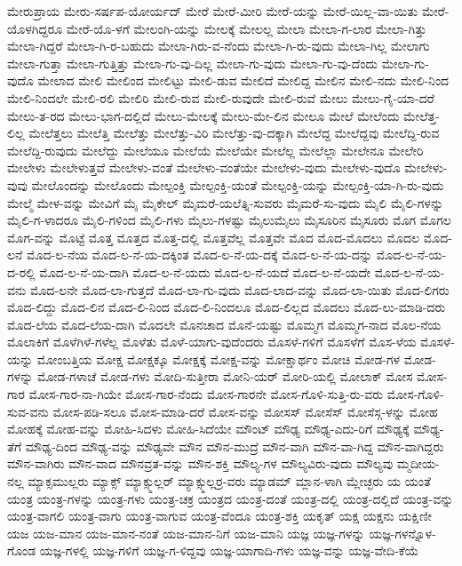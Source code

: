 {ಮೇರುಪ್ರಾಯ
ಮೇರು-ಸರ್ಷಪ-ಯೋರ್ಯದ್
ಮೇರೆ
ಮೇರೆ-ಮೀರಿ
ಮೇರೆ-ಯನ್ನು
ಮೇರೆ-ಯಿಲ್ಲ-ವಾ-ಯಿತು
ಮೇರೆ-ಯೊಳಗಿದ್ದರೂ
ಮೇರೆ-ಯೊ-ಳಗೆ
ಮೇಲಂಗಿ-ಯನ್ನು
ಮೇಲಕ್ಕೆ
ಮೇಲಲ್ಲ
ಮೇಲಾ
ಮೇಲಾ-ಗ-ಲಾರ
ಮೇಲಾ-ಗಿತ್ತು
ಮೇಲಾ-ಗಿದ್ದರೆ
ಮೇಲಾ-ಗಿ-ರ-ಬಹುದು
ಮೇಲಾ-ಗಿರು-ವ-ನೆಂದು
ಮೇಲಾ-ಗಿ-ರು-ವುದು
ಮೇಲಾ-ಗಿಲ್ಲ
ಮೇಲಾಗು
ಮೇಲಾ-ಗುತ್ತಾ
ಮೇಲಾ-ಗುತ್ತಿತ್ತು
ಮೇಲಾ-ಗು-ವು-ದಿಲ್ಲ
ಮೇಲಾ-ಗು-ವುದು
ಮೇಲಾ-ಗು-ವು-ದೆಂದು
ಮೇಲಾ-ಗು-ವುದೊ
ಮೇಲಾದ
ಮೇಲಿ
ಮೇಲಿಂದ
ಮೇಲಿಟ್ಟು
ಮೇಲಿ-ಡುವ
ಮೇಲಿದೆ
ಮೇಲಿದ್ದ
ಮೇಲಿನ
ಮೇಲಿ-ನದು
ಮೇಲಿ-ನಿಂದ
ಮೇಲಿ-ನಿಂದಲೇ
ಮೇಲಿ-ರಲಿ
ಮೇಲಿರಿ
ಮೇಲಿ-ರುವ
ಮೇಲಿ-ರುವುದೇ
ಮೇಲಿ-ರುವೆ
ಮೇಲು
ಮೇಲು-ಗೈ-ಯಾ-ದರೆ
ಮೇಲು-ತ-ರದ
ಮೇಲು-ಭಾಗ-ದಲ್ಲಿದೆ
ಮೇಲು-ಮೇಲಕ್ಕೆ
ಮೇಲು-ಮೇ-ಲಿನ
ಮೇಲೂ
ಮೇಲೆ
ಮೇಲೆಂದು
ಮೇಲೆತ್ತ-ಲಿಲ್ಲ
ಮೇಲೆತ್ತಲು
ಮೇಲೆತ್ತಿ
ಮೇಲೆತ್ತು
ಮೇಲೆತ್ತು-ವಿರಿ
ಮೇಲೆತ್ತು-ವು-ದಕ್ಕಾಗಿ
ಮೇಲೆದ್ದ
ಮೇಲೆದ್ದವು
ಮೇಲೆದ್ದಿ-ರುವ
ಮೇಲೆದ್ದಿ-ರುವುದು
ಮೇಲೆದ್ದು
ಮೇಲೆಯೂ
ಮೇಲೆಯೆ
ಮೇಲೆಯೇ
ಮೇಲೆಲ್ಲ
ಮೇಲೆಲ್ಲಾ
ಮೇಲೇನೂ
ಮೇಲೇರಿ
ಮೇಲೇಳು
ಮೇಲೇಳುತ್ತವೆ
ಮೇಲೇಳು-ವಂತೆ
ಮೇಲೇಳು-ವಂತೆಯೇ
ಮೇಲೇಳು-ವುದು
ಮೇಲೇಳು-ವುದೊ
ಮೇಲೇಳು-ವುವು
ಮೇಲೊಂದನ್ನು
ಮೇಲೊಂದು
ಮೇಲ್ಪಂಕ್ತಿ
ಮೇಲ್ಪಂಕ್ತಿ-ಯಂತೆ
ಮೇಲ್ಪಂಕ್ತಿ-ಯನ್ನು
ಮೇಲ್ಪಂಕ್ತಿ-ಯಾ-ಗಿ-ರು-ವುದು
ಮೇಲ್ಮೆ
ಮೇಳ-ವನ್ನು
ಮೇವಿಗೆ
ಮೈ
ಮೈಕೇಲ್
ಮೈಮರೆ-ಯಲೆತ್ನಿ-ಸುವರು
ಮೈಮರೆ-ಸು-ವುದು
ಮೈಲಿ
ಮೈಲಿ-ಗಳನ್ನು
ಮೈಲಿ-ಗ-ಳಾದರೂ
ಮೈಲಿ-ಗಳಿಂದ
ಮೈಲಿ-ಗಳು
ಮೈಲು-ಗಳಷ್ಟು
ಮೈಲುಮೈಲು
ಮೈಸೂರಿನ
ಮೈಸೂರು
ಮೊಗ
ಮೊಗಲ
ಮೊಗ-ವನ್ನು
ಮೊಟ್ಟೆ
ಮೊತ್ತ
ಮೊತ್ತದ
ಮೊತ್ತ-ದಲ್ಲಿ
ಮೊತ್ತವೆಲ್ಲ
ಮೊತ್ತವೇ
ಮೊದ
ಮೊದ-ಮೊದಲು
ಮೊದಲ
ಮೊದ-ಲನೆ
ಮೊದ-ಲ-ನೆಯ
ಮೊದ-ಲ-ನೆ-ಯ-ದಕ್ಕಿಂತ
ಮೊದ-ಲ-ನೆ-ಯ-ದಕ್ಕೆ
ಮೊದ-ಲ-ನೆ-ಯ-ದನ್ನು
ಮೊದ-ಲ-ನೆ-ಯ-ದ-ರಲ್ಲಿ
ಮೊದ-ಲ-ನೆ-ಯ-ದಾಗಿ
ಮೊದ-ಲ-ನೆ-ಯದು
ಮೊದ-ಲ-ನೆ-ಯದೆ
ಮೊದ-ಲ-ನೆ-ಯದೇ
ಮೊದ-ಲ-ನೆ-ಯ-ವನು
ಮೊದ-ಲನೇ
ಮೊದ-ಲಾ-ಗುತ್ತದೆ
ಮೊದ-ಲಾ-ಗು-ವುದು
ಮೊದ-ಲಾದ-ವನ್ನು
ಮೊದ-ಲಾ-ಯಿತು
ಮೊದ-ಲಿಗರು
ಮೊದ-ಲಿದ್ದು
ಮೊದ-ಲಿನ
ಮೊದ-ಲಿ-ನಿಂದ
ಮೊದ-ಲಿ-ನಿಂದಲೂ
ಮೊದ-ಲಿಲ್ಲದ
ಮೊದಲು
ಮೊದ-ಲು-ಮಾಡಿ-ದರು
ಮೊದ-ಲೆಯ
ಮೊದ-ಲೆಯ-ದಾಗಿ
ಮೊದಲೇ
ಮೊನಚಾದ
ಮೊನೆ-ಯಷ್ಟು
ಮೊಮ್ಮಗ
ಮೊಮ್ಮಗ-ನಾದ
ಮೊಲ-ನೆಯ
ಮೊಲಾಕಿಗೆ
ಮೊಳೆಗಿಳೆ-ಗಳೆಲ್ಲ
ಮೊಳೆತು
ಮೊಳೆ-ಯಾಗು-ವುದೆಂದರು
ಮೊಸಳೆ-ಗಳಿಗೆ
ಮೊಸಳೆಗೆ
ಮೊಸ-ಳೆಯ
ಮೊಸಳೆ-ಯನ್ನು
ಮೋಂಬತ್ತಿಯ
ಮೋಕ್ಷ
ಮೋಕ್ಷಕ್ಕೂ
ಮೋಕ್ಷಕ್ಕೆ
ಮೋಕ್ಷ-ವನ್ನು
ಮೋಕ್ಷಾರ್ಥಂ
ಮೋಚಿ
ಮೋಡ-ಗಳ
ಮೋಡ-ಗಳನ್ನು
ಮೋಡ-ಗಳಾಚೆ
ಮೋಡ-ಗಳು
ಮೋದಿ-ಸುತ್ತೀರಾ
ಮೋನಿ-ಯರ್
ಮೋರಿ-ಯಲ್ಲಿ
ಮೋಲಾಕ್
ಮೋಸ
ಮೋಸ-ಗಾರ
ಮೋಸ-ಗಾರ-ನಾ-ಗಿಯೇ
ಮೋಸ-ಗಾರ-ನೆಂದು
ಮೋಸ-ಗಾರನೇ
ಮೋಸ-ಗೊಳಿ-ಸುತ್ತಿ-ರು-ವರು
ಮೋಸ-ಗೊಳಿ-ಸುವ-ವನು
ಮೋಸ-ಪಡಿ-ಸಲೂ
ಮೋಸ-ಮಾಡಿ-ದರೆ
ಮೋಸ-ವನ್ನು
ಮೋಸಸ್
ಮೋಸೆಸ್
ಮೋಸೆಸ್ಗ-ಳನ್ನು
ಮೋಹ
ಮೋಹಕ್ಕೆ
ಮೋಹ-ವನ್ನು
ಮೋಹಿ-ಸಿದಳು
ಮೋಹಿ-ಸಿದೆಯೇ
ಮೌಂಟ್
ಮೌಢ್ಯ
ಮೌಢ್ಯ-ಎದು-ರಿಗೆ
ಮೌಢ್ಯಕ್ಕೆ
ಮೌಢ್ಯ-ತೆಗೆ
ಮೌಢ್ಯ-ದಿಂದ
ಮೌಢ್ಯ-ವನ್ನು
ಮೌಢ್ಯವೇ
ಮೌನ
ಮೌನ-ಮುದ್ರೆ
ಮೌನ-ವಾಗಿ
ಮೌನ-ವಾ-ಗಿದ್ದ
ಮೌನ-ವಾಗಿದ್ದರು
ಮೌನ-ವಾಗಿರು
ಮೌನ-ವಾದ
ಮೌನವ್ರತ-ವನ್ನು
ಮೌನ-ಶಕ್ತಿ
ಮೌಲ್ಯ-ಗಳ
ಮೌಲ್ಯವಿರು-ವುದು
ಮೌಲ್ಯವು
ಮ್ಮದೀಯ-ನಲ್ಲ
ಮ್ಯಾಕ್ಸಮುಲ್ಲರು
ಮ್ಯಾಕ್ಸ್
ಮ್ಯಾಕ್ಸ್ಮುಲ್ಲರ್
ಮ್ಯಾಕ್ಸ್ಮುಲ್ಲರ್ರ-ವರು
ಮ್ಯಾಡಮ್
ಮ್ಲಾನ-ಳಾಗಿ
ಮ್ಲೇಚ್ಛರು
ಯ
ಯಂತೆ
ಯಂತ್ರ
ಯಂತ್ರ-ಗಳನ್ನು
ಯಂತ್ರ-ಗಳು
ಯಂತ್ರ-ಚಕ್ರ
ಯಂತ್ರದ
ಯಂತ್ರ-ದಂತೆ
ಯಂತ್ರ-ದಲ್ಲಿ
ಯಂತ್ರ-ದಲ್ಲಿದೆ
ಯಂತ್ರ-ವನ್ನು
ಯಂತ್ರ-ವಾಗಲಿ
ಯಂತ್ರ-ವಾಗು
ಯಂತ್ರ-ವಾಗುವ
ಯಂತ್ರ-ವೆಂದೂ
ಯಂತ್ರ-ಶಕ್ತಿ
ಯಕೃತ್
ಯಕ್ಷ
ಯಕ್ಷನು
ಯಕ್ಷಿಣೀ
ಯಜ
ಯಜ-ಮಾನ
ಯಜ-ಮಾನ-ನಂತೆ
ಯಜ-ಮಾನ-ನಿಗೆ
ಯಜ-ಮಾನಿ
ಯಜ್ಞ
ಯಜ್ಞ-ಗಳನ್ನು
ಯಜ್ಞ-ಗಳನ್ನೊಳ-ಗೊಂಡ
ಯಜ್ಞ-ಗಳಲ್ಲಿ
ಯಜ್ಞ-ಗಳಿಗೆ
ಯಜ್ಞ-ಗ-ಳಿದ್ದವು
ಯಜ್ಞ-ಯಾಗಾದಿ-ಗಳು
ಯಜ್ಞ-ವನ್ನು
ಯಜ್ಞ-ವೇದಿ-ಕೆಯೆ
}
